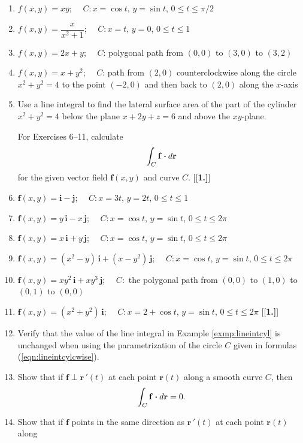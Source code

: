 \begin{enumerate}[\bfseries 1.]
 \item $f(x,y)=xy$; $\quad C: x=\cos t$, $y=\sin t$, $0 \le t \le \pi/2$
 \item $f(x,y)=\dfrac{x}{x^2 + 1}$; $\quad C: x=t$, $y=0$, $0 \le t \le 1$
 \item $f(x,y)=2x+y$; $\quad C$: polygonal path from $(0,0)$ to $(3,0)$ to $(3,2)$
 \item $f(x,y)=x+y^2$; $\quad C$: path from $(2,0)$ counterclockwise along the circle $x^2 + y^2 = 4$ to the point
  $(-2,0)$ and then back to $(2,0)$ along the $x$-axis
 \item Use a line integral to find the lateral surface area of the part of the cylinder\\$x^2 + y^2 = 4$ below
 the plane $x+2y+z=6$ and above the $xy$-plane.
\par\noindent For Exercises 6--11, calculate 
\[\int_C \mathbf{f} \bm{\cdot} d\mathbf{r}\] 
for the given vector
 field $\mathbf{f}(x,y)$ and curve $C$.
[{[\bfseries 1.]}]
 \item $\mathbf{f}(x,y) = \mathbf{i} - \mathbf{j}$; $\quad C: x=3t$, $y=2t$, $0 \le t \le 1$
 \item $\mathbf{f}(x,y) = y\,\mathbf{i} - x\,\mathbf{j}$; $\quad C: x=\cos t$, $y=\sin t$, $0 \le t \le 2\pi$
 \item $\mathbf{f}(x,y) = x\,\mathbf{i} + y\,\mathbf{j}$; $\quad C: x=\cos t$, $ y=\sin t$, $0 \le t \le 2\pi$
 \item $\mathbf{f}(x,y) = (x^2 - y)\,\mathbf{i} + (x-y^2 )\,\mathbf{j}$; $\quad C: x=\cos t$, $y=\sin t$,
  $0 \le t \le 2\pi$
 \item $\mathbf{f}(x,y) = xy^2 \,\mathbf{i} + xy^3 \,\mathbf{j}$; $\quad C:$ the polygonal path from $(0,0)$ to $(1,0)$
 to $(0,1)$ to $(0,0)$
 \item $\mathbf{f}(x,y) =(x^2 + y^2 )\,\mathbf{i}$; $\quad C: x=2+\cos t$, $y=\sin t$, $0 \le t \le 2\pi$
[{[\bfseries 1.]}]
 \item Verify that the value of the line integral in Example \ref{exmp:lineintcyl} is unchanged when using the
  parametrization of the circle $C$ given in formulas (\ref{eqn:lineintcylcwise}).
 \item Show that if $\mathbf{f} \perp \mathbf{r}\,'(t)$ at each point $\mathbf{r}(t)$ along a smooth curve $C$, then
  \[\int_C \mathbf{f} \bm{\cdot} d\mathbf{r} = 0.\]
 \item Show that if $\mathbf{f}$ points in the same direction as $\mathbf{r}\,'(t)$ at each point $\mathbf{r}(t)$ along

\end{enumerate}
